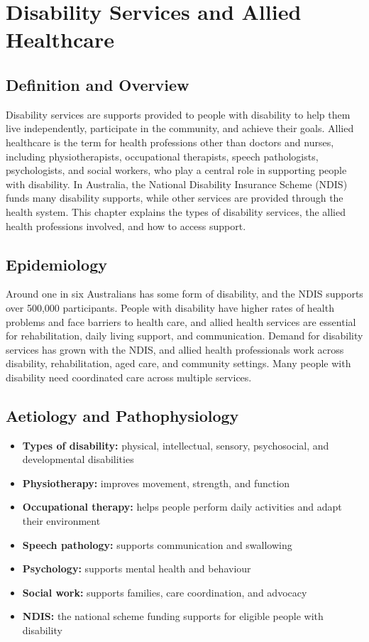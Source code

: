 \chapter{Disability Services and Allied Healthcare}

\section*{Definition and Overview}
Disability services are supports provided to people with disability to help them live independently, participate in the community, and achieve their goals. Allied healthcare is the term for health professions other than doctors and nurses, including physiotherapists, occupational therapists, speech pathologists, psychologists, and social workers, who play a central role in supporting people with disability. In Australia, the National Disability Insurance Scheme (NDIS) funds many disability supports, while other services are provided through the health system. This chapter explains the types of disability services, the allied health professions involved, and how to access support.

\section*{Epidemiology}
Around one in six Australians has some form of disability, and the NDIS supports over 500,000 participants. People with disability have higher rates of health problems and face barriers to health care, and allied health services are essential for rehabilitation, daily living support, and communication. Demand for disability services has grown with the NDIS, and allied health professionals work across disability, rehabilitation, aged care, and community settings. Many people with disability need coordinated care across multiple services.

\section*{Aetiology and Pathophysiology}
\begin{itemize}
    \item \textbf{Types of disability:} physical, intellectual, sensory, psychosocial, and developmental disabilities
    \item \textbf{Physiotherapy:} improves movement, strength, and function
    \item \textbf{Occupational therapy:} helps people perform daily activities and adapt their environment
    \item \textbf{Speech pathology:} supports communication and swallowing
    \item \textbf{Psychology:} supports mental health and behaviour
    \item \textbf{Social work:} supports families, care coordination, and advocacy
    \item \textbf{NDIS:} the national scheme funding supports for eligible people with disability
\end{itemize}

